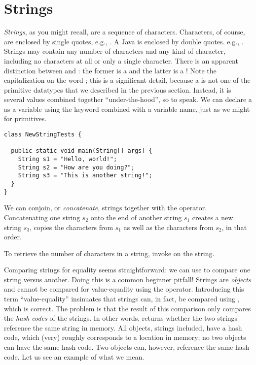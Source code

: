 \section{Strings}

\textit{Strings}, as you might recall, are a sequence of characters. Characters, of course, are enclosed by single quotes, e.g., . A Java  is enclosed by double quotes. e.g., . Strings may contain any number of characters and any kind of character, including no characters at all or only a single character. There is an apparent distinction between  and : the former is a  and the latter is a ! Note the capitalization on the word ; this is a significant detail, because a  is not one of the primitive datatypes that we described in the previous section. Instead, it is several  values combined together ``under-the-hood'', so to speak. We can declare a  as a variable using the keyword combined with a variable name, just as we might for primitives. 

\begin{cl}{}
\begin{lstlisting}[language=MyJava]
class NewStringTests {

  public static void main(String[] args) {
    String s1 = "Hello, world!";
    String s2 = "How are you doing?";
    String s3 = "This is another string!";
  }
}
\end{lstlisting}
\end{cl}

We can conjoin, or \textit{concatenate}, strings together with the \ttt{+} operator. Concatenating one string $s_2$ onto the end of another string $s_1$ creates a new string $s_3$, copies the characters from $s_1$ as well as the characters from $s_2$, in that order. 

To retrieve the number of characters in a string, invoke  on the string.

Comparing strings for equality seems straightforward: we can use \ttt{==} to compare one string versus another. Doing this is a common beginner pitfall! Strings are \textit{objects} and cannot be compared for value-equality using the \ttt{==} operator. Introducing this term ``value-equality'' insinuates that strings can, in fact, be compared using \ttt{==}, which is correct. The problem is that the result of this comparison only compares the \textit{hash codes} of the strings. In other words,  returns whether the two strings reference the same string in memory. All objects, strings included, have a hash code, which (very) roughly corresponds to a location in memory; no two objects can have the same hash code. Two objects can, however, reference the same hash code. Let us see an example of what we mean.

